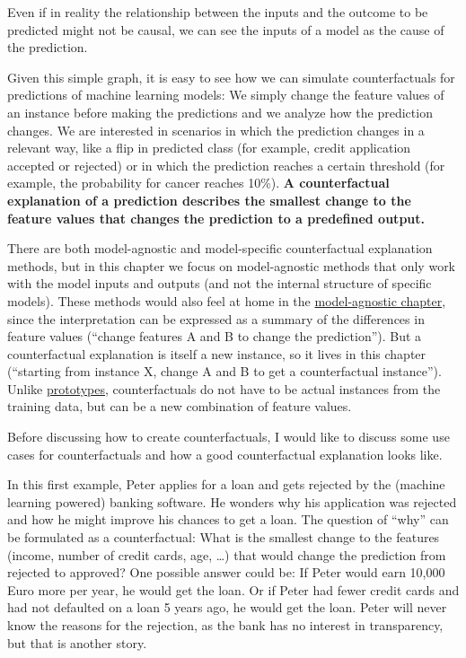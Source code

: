\documentclass[12pt,]{krantz}
\begin{document}
Even if in reality the relationship between the inputs and the outcome
to be predicted might not be causal, we can see the inputs of a model as
the cause of the prediction.

Given this simple graph, it is easy to see how we can simulate
counterfactuals for predictions of machine learning models: We simply
change the feature values of an instance before making the predictions
and we analyze how the prediction changes. We are interested in
scenarios in which the prediction changes in a relevant way, like a flip
in predicted class (for example, credit application accepted or
rejected) or in which the prediction reaches a certain threshold (for
example, the probability for cancer reaches 10\%). \textbf{A
counterfactual explanation of a prediction describes the smallest change
to the feature values that changes the prediction to a predefined
output.}

There are both model-agnostic and model-specific counterfactual
explanation methods, but in this chapter we focus on model-agnostic
methods that only work with the model inputs and outputs (and not the
internal structure of specific models). These methods would also feel at
home in the \protect\hyperlink{agnostic}{model-agnostic chapter}, since
the interpretation can be expressed as a summary of the differences in
feature values (``change features A and B to change the prediction'').
But a counterfactual explanation is itself a new instance, so it lives
in this chapter (``starting from instance X, change A and B to get a
counterfactual instance''). Unlike
\protect\hyperlink{proto}{prototypes}, counterfactuals do not have to be
actual instances from the training data, but can be a new combination of
feature values.

Before discussing how to create counterfactuals, I would like to discuss
some use cases for counterfactuals and how a good counterfactual
explanation looks like.

In this first example, Peter applies for a loan and gets rejected by the
(machine learning powered) banking software. He wonders why his
application was rejected and how he might improve his chances to get a
loan. The question of ``why'' can be formulated as a counterfactual:
What is the smallest change to the features (income, number of credit
cards, age, \ldots{}) that would change the prediction from rejected to
approved? One possible answer could be: If Peter would earn 10,000 Euro
more per year, he would get the loan. Or if Peter had fewer credit cards
and had not defaulted on a loan 5 years ago, he would get the loan.
Peter will never know the reasons for the rejection, as the bank has no
interest in transparency, but that is another story.
\end{document}
